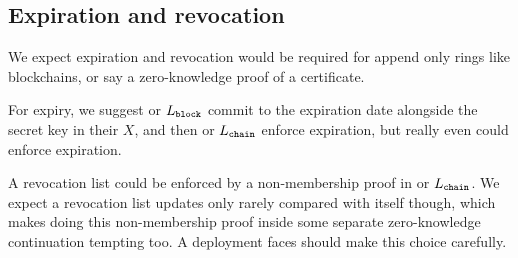 \subsection{Expiration and revocation}

We expect expiration and revocation would be required for append only
rings like blockchains, or say a zero-knowledge proof of a certificate.

For expiry, we suggest \pisk or $L_{\mathtt{block}}$ commit to
the expiration date alongside the secret key in their $X$, and
then \pipk or $L_{\mathtt{chain}}$ enforce expiration, but
 really even \PedVRF could enforce expiration.

A revocation list could be enforced by a non-membership proof in
\pipk or $L_{\mathtt{chain}}$.
We expect a revocation list updates only rarely compared with \ring
itself though, which makes doing this non-membership proof inside some
separate zero-knowledge continuation tempting too.
A deployment faces should make this choice carefully.


